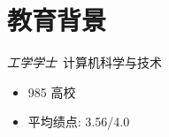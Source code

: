 \section{教育背景}
\textit{工学学士}\ 计算机科学与技术
\begin{itemize}
  \item 985 高校
  \item 平均绩点: 3.56/4.0
\end{itemize}